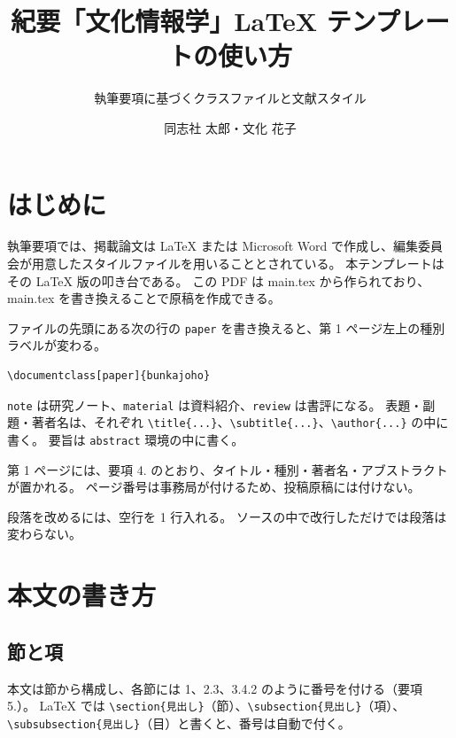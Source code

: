 \documentclass[paper]{bunkajoho}
\title{紀要「文化情報学」LaTeX テンプレートの使い方}
\subtitle{執筆要項に基づくクラスファイルと文献スタイル}   %
\author{同志社 太郎・文化 花子}                           %
\begin{document}
\maketitle   %

\section{はじめに}

執筆要項では、掲載論文は LaTeX または Microsoft Word で作成し、編集委員会が用意したスタイルファイルを用いることとされている。
本テンプレートはその LaTeX 版の叩き台である。
この PDF は main.tex から作られており、main.tex を書き換えることで原稿を作成できる。

ファイルの先頭にある次の行の \verb|paper| を書き換えると、第 1 ページ左上の種別ラベルが変わる。
\begin{verbatim}
\documentclass[paper]{bunkajoho}
\end{verbatim}
\verb|note| は研究ノート、\verb|material| は資料紹介、\verb|review| は書評になる。
表題・副題・著者名は、それぞれ \verb|\title{...}|、\verb|\subtitle{...}|、\verb|\author{...}| の中に書く。
要旨は \verb|abstract| 環境の中に書く。

第 1 ページには、要項 4. のとおり、タイトル・種別・著者名・アブストラクトが置かれる。
ページ番号は事務局が付けるため、投稿原稿には付けない。

段落を改めるには、空行を 1 行入れる。
ソースの中で改行しただけでは段落は変わらない。

\section{本文の書き方}

\subsection{節と項}

本文は節から構成し、各節には 1、2.3、3.4.2 のように番号を付ける（要項 5.）。
LaTeX では \verb|\section{見出し}|（節）、\verb|\subsection{見出し}|（項）、
\verb|\subsubsection{見出し}|（目）と書くと、番号は自動で付く。
\end{document}
